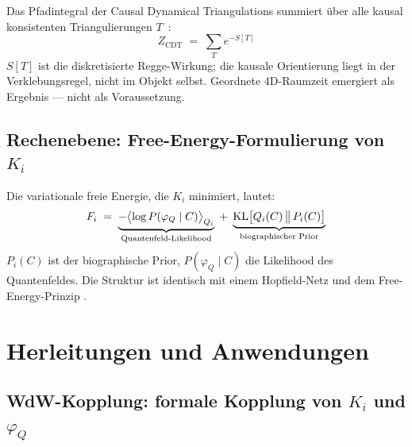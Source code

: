 \documentclass[11pt,a4paper]{article}
\begin{document}
Das Pfadintegral der Causal Dynamical Triangulations summiert über alle
kausal konsistenten Triangulierungen $T$~\citep{ambjorn2004}:
\begin{equation}
  Z_{\mathrm{CDT}} \;=\; \sum_T e^{-S[T]}
  \label{eq:cdt}
\end{equation}
$S[T]$ ist die diskretisierte Regge-Wirkung; die kausale Orientierung liegt
in der Verklebungsregel, nicht im Objekt selbst. Geordnete 4D-Raumzeit
emergiert als Ergebnis — nicht als Voraussetzung.

\subsection*{Rechenebene: Free-Energy-Formulierung von $K_i$}

Die variationale freie Energie, die $K_i$ minimiert, lautet:
\begin{equation}
  F_i \;=\;
  \underbrace{-\bigl\langle\log P(\varphi_Q \mid C)\bigr\rangle_{Q_i}}_{%
    \text{Quantenfeld-Likelihood}}
  \;+\;
  \underbrace{\mathrm{KL}\bigl[Q_i(C)\,\big\|\,P_i(C)\bigr]}_{%
    \text{biographischer Prior}}
  \label{eq:freeenergy}
\end{equation}
$P_i(C)$ ist der biographische Prior, $P(\varphi_Q \mid C)$ die Likelihood
des Quantenfeldes. Die Struktur ist identisch mit einem Hopfield-Netz
\citep{hopfield1982} und dem Free-Energy-Prinzip
\citep{friston2010,raoballard1999}.

\section{Herleitungen und Anwendungen}
\label{app:herleitungen}

\subsection*{WdW-Kopplung: formale Kopplung von $K_i$ und $\varphi_Q$}
\end{document}
